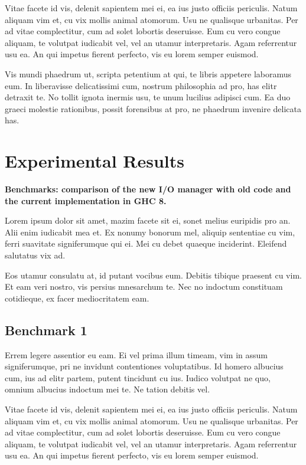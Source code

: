 \documentclass[a4paper,11pt,oneside]{report}
\begin{document}
Vitae facete id vis, delenit sapientem mei ei, ea ius justo officiis
periculis. Natum aliquam vim et, cu vix mollis animal atomorum. Usu ne qualisque
urbanitas. Per ad vitae complectitur, cum ad solet lobortis deseruisse. Eum cu
vero congue aliquam, te volutpat iudicabit vel, vel an utamur
interpretaris. Agam referrentur usu ea. An qui impetus fierent perfecto, vis eu
lorem semper euismod.

Vis mundi phaedrum ut, scripta petentium at qui, te libris appetere laboramus
eum. In liberavisse delicatissimi cum, nostrum philosophia ad pro, has elitr
detraxit te. No tollit ignota inermis usu, te unum lucilius adipisci cum. Ea duo
graeci molestie rationibus, possit forensibus at pro, ne phaedrum invenire
delicata has.

\chapter{Experimental Results}

\textbf{Benchmarks: comparison of the new I/O manager with old code and the
  current implementation in GHC 8.}

Lorem ipsum dolor sit amet, mazim facete sit ei, sonet melius euripidis pro
an. Alii enim iudicabit mea et. Ex nonumy bonorum mel, aliquip sententiae cu
vim, ferri suavitate signiferumque qui ei. Mei cu debet quaeque
inciderint. Eleifend salutatus vix ad.

Eos utamur consulatu at, id putant vocibus eum. Debitis tibique praesent cu
vim. Et eam veri nostro, vis persius mnesarchum te. Nec no indoctum constituam
cotidieque, ex facer mediocritatem eam.

\section{Benchmark 1}

Errem legere assentior eu eam. Ei vel prima illum timeam, vim in assum
signiferumque, pri ne invidunt contentiones voluptatibus. Id homero albucius
cum, ius ad elitr partem, putent tincidunt cu ius. Iudico volutpat ne quo,
omnium albucius indoctum mei te. Ne tation debitis vel.

Vitae facete id vis, delenit sapientem mei ei, ea ius justo officiis
periculis. Natum aliquam vim et, cu vix mollis animal atomorum. Usu ne qualisque
urbanitas. Per ad vitae complectitur, cum ad solet lobortis deseruisse. Eum cu
vero congue aliquam, te volutpat iudicabit vel, vel an utamur
interpretaris. Agam referrentur usu ea. An qui impetus fierent perfecto, vis eu
lorem semper euismod.
\end{document}
